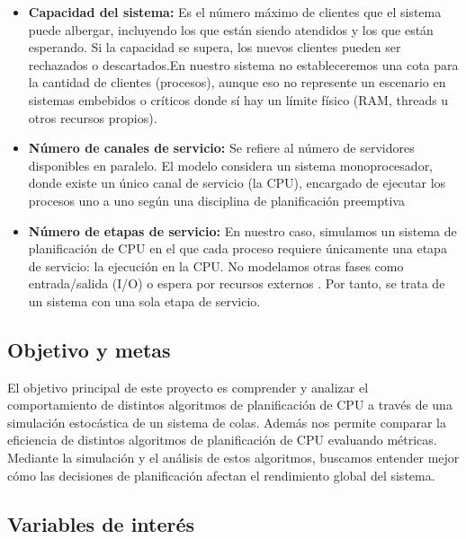 \documentclass[12pt]{article}
\begin{document}
\begin{itemize}
 	\item \textbf{Capacidad del sistema:} Es el número máximo de clientes que el sistema puede albergar, incluyendo los que están siendo atendidos y los que están esperando. Si la capacidad se supera, los nuevos clientes pueden ser rechazados o descartados.En nuestro sistema no estableceremos una cota para la cantidad de clientes (procesos), aunque eso no represente un escenario en sistemas embebidos o críticos donde sí hay un límite físico (RAM, threads u otros recursos propios).
 	 
 	\item \textbf{Número de canales de servicio:} Se refiere al número de servidores disponibles en paralelo. El modelo considera un sistema monoprocesador, donde existe un único canal de servicio (la CPU), encargado de ejecutar los procesos uno a uno según una disciplina de planificación preemptiva
 	
 	\item \textbf{Número de etapas de servicio:}  En nuestro caso, simulamos un sistema de planificación de CPU en el que cada proceso requiere únicamente una etapa de servicio: la ejecución en la CPU. No modelamos otras fases como entrada/salida (I/O) o espera por recursos externos . Por tanto, se trata de un sistema con una sola etapa de servicio.
 	
 \end{itemize}
	
\subsection{Objetivo y metas}

El objetivo principal de este proyecto es comprender y analizar el comportamiento de distintos algoritmos de planificación de CPU a través de una simulación estocástica de un sistema de colas. Adem\'as nos permite comparar la eficiencia de distintos algoritmos de planificación de CPU  evaluando métricas. Mediante la simulación y el análisis de estos algoritmos, buscamos entender mejor cómo las decisiones de planificación afectan el rendimiento global del sistema.

\subsection{Variables de interés }
\end{document}
